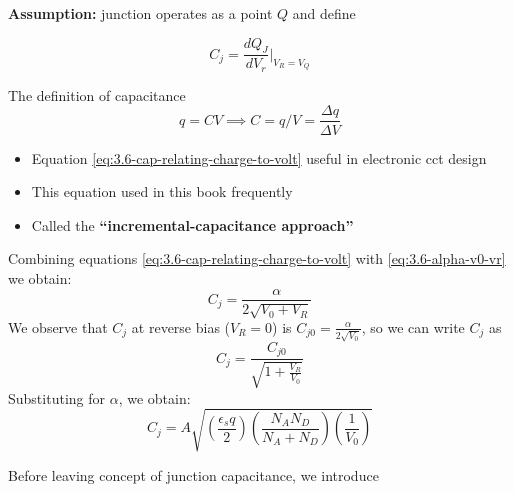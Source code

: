 \documentclass{report}
\begin{document}
\textbf{Assumption:} junction operates as a point $Q$ and define

\begin{equation}
	C_j = \frac{dQ_J}{dV_r} \bigg| _{V_R=V_Q}
	\label{eq:3.6-cap-relating-charge-to-volt}
\end{equation}
\begin{note}
	The definition of capacitance
	\begin{equation*}
		q = CV
		\implies C = q/V = \frac{\Delta q}{\Delta V}
	\end{equation*}
	\begin{itemize}
		\item Equation \ref{eq:3.6-cap-relating-charge-to-volt} useful in electronic cct design
		\item This equation used in this book frequently
		\item Called the \textbf{``incremental-capacitance approach''}
	\end{itemize}
\end{note}

Combining equations \ref{eq:3.6-cap-relating-charge-to-volt} with \ref{eq:3.6-alpha-v0-vr} we obtain:
\begin{equation}
	C_j = \frac{\alpha}{2\sqrt{V_0 + V_R}}
	\label{eq:3.6-derivative-Cj}
\end{equation}
We observe that $C_j$ at reverse bias ($V_R = 0$) is $C_{j0} = \frac{\alpha}{2\sqrt{V_0}}$, so we can write $C_j$ as
\begin{equation}
	C_j = \frac{C_{j0}}{\sqrt{1+\frac{V_R}{V_0}}}
	\label{eq:3.6-cj-wrt-cj0}
\end{equation}
Substituting for $\alpha$, we obtain:
\begin{equation}
	C_j = A \sqrt{\left(
		\frac{\epsilon_s q}{2}
	\right)\left(
		\frac{N_A N_D}{N_A + N_D}
	\right)\left(
		\frac{1}{V_0}
	\right)}
	\label{eq:3.6-cj-wrt-cj0-alpha-sub}
\end{equation}

Before leaving concept of junction capacitance, we introduce
\end{document}
